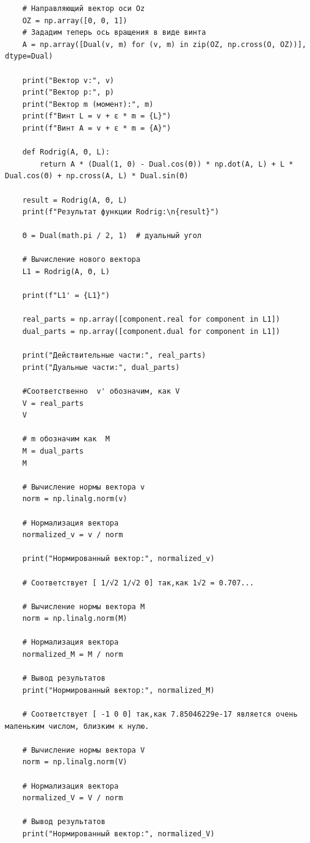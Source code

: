 \begin{verbatim}
    # Направляющий вектор оси Oz
    OZ = np.array([0, 0, 1])
    # Зададим теперь ось вращения в виде винта
    A = np.array([Dual(v, m) for (v, m) in zip(OZ, np.cross(O, OZ))], dtype=Dual)

    print("Вектор v:", v)
    print("Вектор p:", p)
    print("Вектор m (момент):", m)
    print(f"Винт L = v + ε * m = {L}")
    print(f"Винт A = v + ε * m = {A}")

    def Rodrig(A, Θ, L):
        return A * (Dual(1, 0) - Dual.cos(Θ)) * np.dot(A, L) + L * Dual.cos(Θ) + np.cross(A, L) * Dual.sin(Θ)

    result = Rodrig(A, Θ, L)
    print(f"Результат функции Rodrig:\n{result}")

    Θ = Dual(math.pi / 2, 1)  # дуальный угол

    # Вычисление нового вектора
    L1 = Rodrig(A, Θ, L)

    print(f"L1' = {L1}")

    real_parts = np.array([component.real for component in L1])
    dual_parts = np.array([component.dual for component in L1])

    print("Действительные части:", real_parts)
    print("Дуальные части:", dual_parts)

    #Соответственно  v' обозначим, как V
    V = real_parts
    V

    # m обозначим как  M
    M = dual_parts
    M

    # Вычисление нормы вектора v
    norm = np.linalg.norm(v)

    # Нормализация вектора
    normalized_v = v / norm

    print("Нормированный вектор:", normalized_v)

    # Соответствует [ 1/√2 1/√2 0] так,как 1√2 = 0.707...

    # Вычисление нормы вектора M
    norm = np.linalg.norm(M)

    # Нормализация вектора
    normalized_M = M / norm

    # Вывод результатов
    print("Нормированный вектор:", normalized_M)

    # Соответствует [ -1 0 0] так,как 7.85046229e-17 является очень маленьким числом, близким к нулю.

    # Вычисление нормы вектора V
    norm = np.linalg.norm(V)

    # Нормализация вектора
    normalized_V = V / norm

    # Вывод результатов
    print("Нормированный вектор:", normalized_V)


\end{verbatim}
